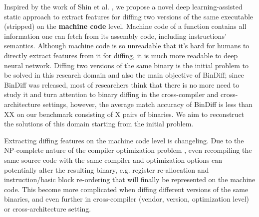 \documentclass[10pt,conference]{IEEEtran}
\begin{document}
Inspired by the work of Shin et al. \cite{shin2015recognizing}, we propose a novel deep learning-assisted static approach to extract features for 
diffing two versions of the same executable (stripped) on the {\textbf{machine code}} level. 
Machine code of a function contains all information one can fetch from its assembly code, including instructions’ semantics. 
Although machine code is so unreadable that it’s hard for humans to directly extract features from it for diffing, 
it is much more readable to deep neural network. 
Diffing two versions of the same binary is the initial problem to be solved in this research domain \cite{wang2000bmat} and 
also the main objective of BinDiff; 
since BinDiff was released, most of researchers think that there is no more need to study it and turn attention to binary 
diffing in the cross-compiler and cross-architecture settings, however, the average match accuracy of BinDiff is less than {\color{red}XX} 
on our benchmark consisting of {\color{red}X} pairs of binaries. 
We aim to reconstruct the solutions of this domain starting from the initial problem.

Extracting diffing features on the machine code level is changeling. 
Due to the NP-complete nature of the compiler optimization problem \cite{aho2003compilers}, 
even recompiling the same source code with the same compiler and optimization options can potentially alter the resulting binary, 
e.g. register re-allocation and instruction/basic block re-ordering that will finally be represented on the machine code. 
This become more complicated when diffing different versions of the same binaries, and even further in cross-compiler (vendor, version, optimization level) 
or cross-architecture setting.
\end{document}

